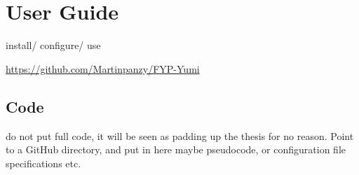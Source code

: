 \chapter{User Guide}

install/ configure/ use


\url{https://github.com/Martinpanzy/FYP-Yumi}

\section{Code}

do not put full code, it will be seen as padding up the thesis for no reason. Point to a GitHub directory, and put in here maybe pseudocode, or configuration file specifications etc. 